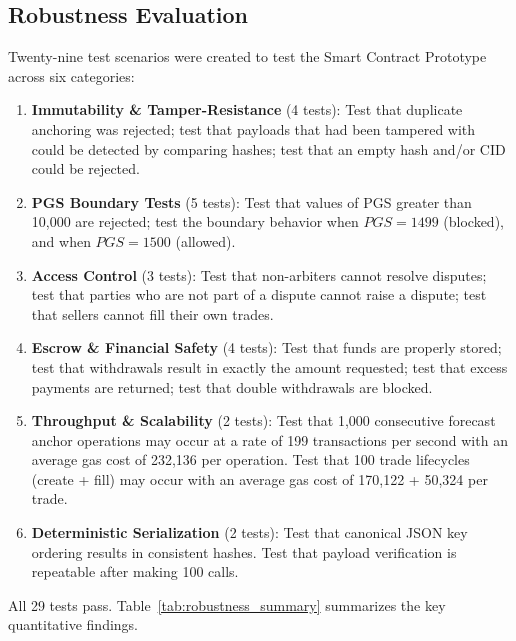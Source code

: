 \documentclass{ieeeaccess}
\begin{document}
\subsection{Robustness Evaluation}

Twenty-nine test scenarios were created to test the Smart Contract Prototype across six categories:

\begin{enumerate}
\item \textbf{Immutability \& Tamper-Resistance} (4 tests): Test that duplicate anchoring was rejected; test that payloads that had been tampered with could be detected by comparing hashes; test that an empty hash and/or CID could be rejected.
\item \textbf{PGS Boundary Tests} (5 tests): Test that values of PGS greater than 10{,}000 are rejected; test the boundary behavior when $PGS = 1499$ (blocked), and when $PGS = 1500$ (allowed).
\item \textbf{Access Control} (3 tests): Test that non-arbiters cannot resolve disputes; test that parties who are not part of a dispute cannot raise a dispute; test that sellers cannot fill their own trades.
\item \textbf{Escrow \& Financial Safety} (4 tests): Test that funds are properly stored; test that withdrawals result in exactly the amount requested; test that excess payments are returned; test that double withdrawals are blocked.
\item \textbf{Throughput \& Scalability} (2 tests): Test that 1{,}000 consecutive forecast anchor operations may occur at a rate of 199 transactions per second with an average gas cost of 232{,}136 per operation. Test that 100 trade lifecycles (create + fill) may occur with an average gas cost of 170{,}122 + 50{,}324 per trade.
\item \textbf{Deterministic Serialization} (2 tests): Test that canonical JSON key ordering results in consistent hashes. Test that payload verification is repeatable after making 100 calls.
\end{enumerate}

All 29 tests pass. Table~\ref{tab:robustness_summary} summarizes the key quantitative findings.
\end{document}
